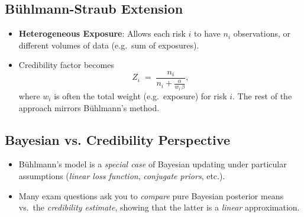 \documentclass[13pt,a4paper]{article}
\begin{document}
\subsection{B\"{u}hlmann-Straub Extension}
\begin{itemize}
  \item \textbf{Heterogeneous Exposure}: Allows each risk \(i\) to have \(n_i\) observations, or different volumes of data (e.g.\ sum of exposures).
  \item Credibility factor becomes
  \[
    Z_i \;=\; \frac{n_i}{n_i + \frac{\alpha}{w_i \,\beta}},
  \]
  where \(w_i\) is often the total weight (e.g.\ exposure) for risk \(i\). The rest of the approach mirrors B\"{u}hlmann’s method.
\end{itemize}

\subsection{Bayesian vs. Credibility Perspective}
\begin{itemize}
  \item B\"{u}hlmann’s model is a \emph{special case} of Bayesian updating under particular assumptions (\emph{linear loss function}, \emph{conjugate priors}, etc.).
  \item Many exam questions ask you to \emph{compare} pure Bayesian posterior means vs.\ the \emph{credibility estimate}, showing that the latter is a \emph{linear} approximation.
\end{itemize}
\end{document}

